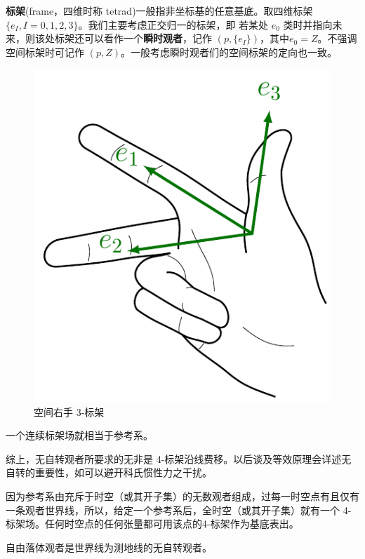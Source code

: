 

\textbf{标架}(frame，四维时称 tetrad)一般指非坐标基的任意基底。取四维标架 $\{e_I, I =0,1,2,3\}$。我们主要考虑正交归一的标架，即
若某处 $e_0$ 类时并指向未来，则该处标架还可以看作一个\textbf{瞬时观者}，记作 $(p,\{e_I\})$，其中$e_0=Z$。不强调空间标架时可记作 $(p,Z)$。一般考虑瞬时观者们的空间标架的定向也一致。

\begin{figure}
    \includegraphics[width=.3\textwidth]{fig/chpt01/frame.pdf}
    \caption{空间右手 3-标架}
\end{figure}

一个连续标架场就相当于参考系。

综上，无自转观者所要求的无非是 4-标架沿线费移。以后谈及等效原理会详述无自转的重要性，如可以避开科氏惯性力之干扰。


因为参考系由充斥于时空（或其开子集）的无数观者组成，过每一时空点有且仅有一条观者世界线，所以，给定一个参考系后，全时空（或其开子集）就有一个 4-标架场。任何时空点的任何张量都可用该点的4-标架作为基底表出。
 


\begin{definition}[惯性观者]
    自由落体观者是世界线为测地线的无自转观者。
\end{definition}


